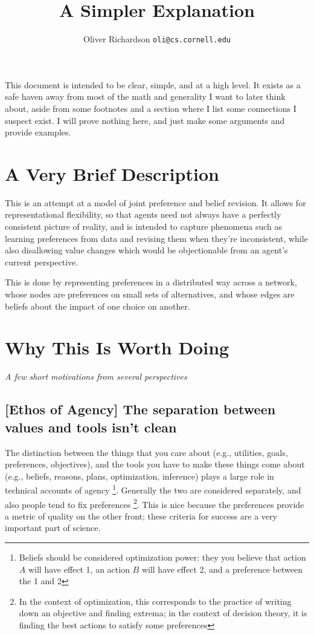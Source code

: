 \documentclass{article}
\title{A Simpler Explanation}
\author{Oliver Richardson  \texttt{oli@cs.cornell.edu}}
\begin{document}
	This document is intended to be clear, simple, and at a high level. It exists as a safe haven away from most of the math and generality I want to later think about, aside from some footnotes and a section where I list some connections I suspect exist. I will prove nothing here, and just make some arguments and provide examples.
	
	\section{A Very Brief Description}
	This is an attempt at a model of joint preference and belief revision. It allows for representational flexibility, so that agents need not always have a perfectly consistent picture of reality, and is intended to capture phenomena such as learning preferences from data and revising them when they're inconsistent, while also disallowing value changes which would be objectionable from an agent's current perspective.
	
	This is done by representing preferences in a distributed way across a network, whose nodes are preferences on small sets of alternatives, and whose edges are beliefs about the impact of one choice on another.
	
	

	\section{Why This Is Worth Doing}
	\vspace{-1em}
	\textit{A few short motivations from several perspectives}
	
	\subsection*{[Ethos of Agency] The separation between values and tools isn't clean}
	The distinction between the things that you care about (e.g., utilities, goals, preferences, objectives), and the tools you have to make these things come about (e.g., beliefs, reasons, plans, optimization, inference) plays a large role in technical accounts of agency%
	\footnote{Beliefs should be considered optimization power: they you believe that action $A$ will have effect 1, an action $B$ will have effect 2, and a preference between the 1 and 2}. Generally the two are considered separately, and also people tend to fix preferences%
	\footnote{In the context of optimization, this corresponds to the practice of writing down an objective and finding extrema; in the context of decision theory, it is finding the best actions to satisfy some preferences}. This is nice because the preferences provide a metric of quality on the other front; these criteria for success are a very important part of science.
	
\end{document}
